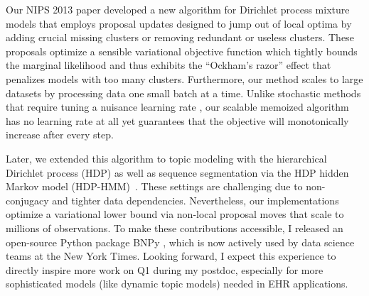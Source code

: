 \documentclass[11pt,letterpaper]{article}
\begin{document}
Our NIPS 2013 paper \cite{hughes2013moVB} developed a new algorithm for Dirichlet process mixture models that employs proposal updates designed to jump out of local optima by adding crucial missing clusters or removing redundant or useless clusters. 
These proposals optimize a sensible variational objective function which tightly bounds the marginal likelihood and thus exhibits the ``Ockham's razor'' effect that penalizes models with too many clusters.
Furthermore, our method scales to large datasets by processing data one small batch at a time. Unlike stochastic methods that require tuning a nuisance learning rate \cite{hoffman:svi}, our scalable memoized algorithm has no learning rate at all yet guarantees that the objective will monotonically increase after every step.


Later, we extended this algorithm to topic modeling with the hierarchical Dirichlet process (HDP) \citep{hughes2015hdpreliable} as well as sequence segmentation via the HDP hidden Markov model (HDP-HMM)~\citep{hughes2015hdphmm}. 
These settings are challenging due to non-conjugacy and tighter data dependencies.
Nevertheless, our implementations optimize a variational lower bound via non-local proposal moves that scale to millions of observations.
To make these contributions accessible, I released an open-source Python package BNPy \citep{hughes2017bnpy}, which is now actively used by data science teams at the New York Times.
Looking forward, I expect this experience to directly inspire 
more work on Q1 during my postdoc, especially for more sophisticated models (like dynamic topic models) needed in EHR applications.
\end{document}
